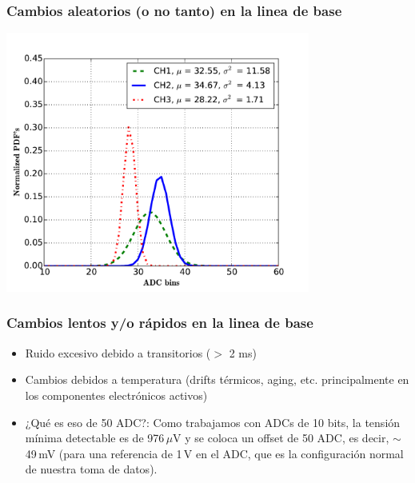\documentclass{beamer}
\begin{document}
\begin{frame}
  \frametitle{Cambios aleatorios (o no tanto) en la linea de base}
  \begin{block}{}
    \centering
    \includegraphics[height=0.55\textheight,width=0.75\textwidth]{d5/histogramas_por_canal_fija}
  \end{block}
\end{frame}

\begin{frame}
  \frametitle{Cambios lentos y/o rápidos en la linea de base}
    \begin{block}{}
      \begin{itemize}
        \pause
        \item Ruido excesivo debido a transitorios ($>$ 2 ms)
        \pause
        \item Cambios debidos a temperatura (drifts térmicos, aging, etc.
              principalmente en los componentes electrónicos activos)
        \pause
        \item ¿Qué es eso de 50 ADC?: Como trabajamos con ADCs de 10 bits, la
              tensión mínima detectable es de 976\,$\mu$V y se coloca un offset de
              50 ADC, es decir, $\sim$49\,mV (para una referencia de 1\,V en el
              ADC, que es la configuración normal de nuestra toma de datos).
      \end{itemize}
    \end{block}
\end{frame}
\end{document}
